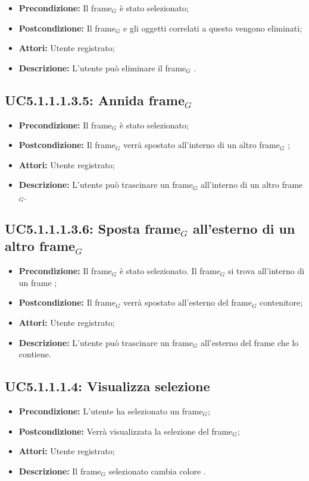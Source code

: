 \begin{itemize}
	\item \textbf{Precondizione:} Il frame$_G$ è stato selezionato;
	\item \textbf{Postcondizione:} Il frame$_G$ e gli oggetti correlati a questo vengono eliminati;
	\item \textbf{Attori:} Utente registrato;
	\item \textbf{Descrizione:} L'utente può eliminare il frame$_G$ .
\end{itemize}
\subsection{ UC5.1.1.1.3.5: Annida frame$_G$}

\begin{itemize}
	\item \textbf{Precondizione:} Il frame$_G$ è stato selezionato;
	\item \textbf{Postcondizione:} Il frame$_G$ verrà spostato all'interno di un altro frame$_G$  ;
	\item \textbf{Attori:} Utente registrato;
	\item \textbf{Descrizione:} L'utente può trascinare un frame$_G$ all'interno di un altro frame$_G$.
\end{itemize}
\subsection{ UC5.1.1.1.3.6: Sposta frame$_G$ all'esterno di un altro frame$_G$  }

\begin{itemize}
	\item \textbf{Precondizione:} Il frame$_G$ è stato selezionato. Il frame$_G$ si trova all'interno di un frame ;
	\item \textbf{Postcondizione:} Il frame$_G$ verrà spostato all'esterno del frame$_G$ contenitore;
	\item \textbf{Attori:} Utente registrato;
	\item \textbf{Descrizione:} L'utente può trascinare un frame$_G$ all'esterno del frame che lo contiene.
\end{itemize}
\subsection{ UC5.1.1.1.4: Visualizza selezione}

\begin{itemize}
	\item \textbf{Precondizione:} L'utente ha selezionato un frame$_G$;
	\item \textbf{Postcondizione:} Verrà visualizzata la selezione del frame$_G$;
	\item \textbf{Attori:} Utente registrato;
	\item \textbf{Descrizione:} Il frame$_G$ selezionato cambia colore .
\end{itemize}
